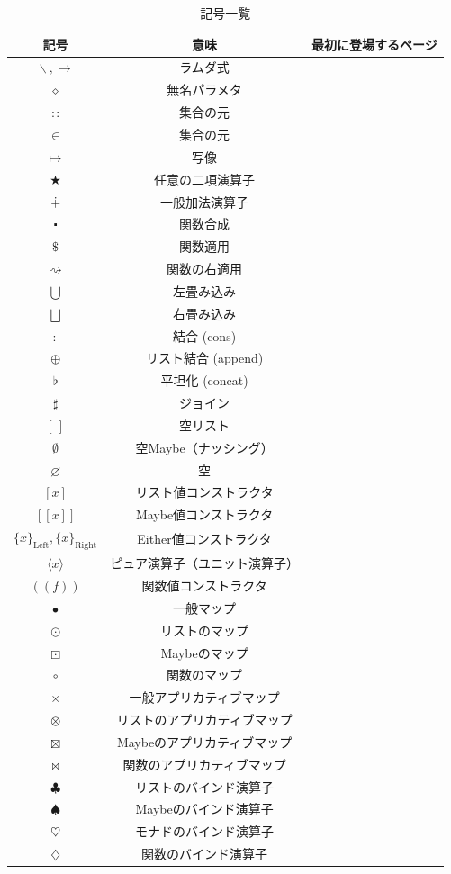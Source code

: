 \documentclass[a4paper,twocolumn]{jsbook}
\def\[{\left[\!\left[}
\def\]{\right]\!\right]}
\def\({\left(\!\left(}
\def\){\right)\!\right)}
\newcommand{\mEmptyList}{{[\,]}}
\newcommand{\mNothing}{\emptyset}
\newcommand{\mPureNothing}{\varnothing}
\newcommand{\mAnonParam}{\diamond}
\DeclareMathOperator{\mAppend}{\oplus}
\DeclareMathOperator{\mApply}{\$}
\DeclareMathOperator{\mApplyRight}{\rightsquigarrow}
\DeclareMathOperator{\mAppMap}{\times}
\DeclareMathOperator{\mAppMapFunc}{\bowtie}
\DeclareMathOperator{\mAppMapList}{\otimes}
\DeclareMathOperator{\mAppMapMaybe}{\boxtimes}
\DeclareMathOperator{\mBind}{\heartsuit}
\DeclareMathOperator{\mBindFunc}{\diamondsuit}
\DeclareMathOperator{\mBindList}{\clubsuit}
\DeclareMathOperator{\mBindMaybe}{\spadesuit}
\DeclareMathOperator{\mBinOp}{\bigstar}
\DeclareMathOperator{\mComp}{\centerdot}
\DeclareMathOperator{\mConcat}{\flat}
\DeclareMathOperator{\mCons}{:}
\DeclareMathOperator*{\mFold}{\bigcup}
\DeclareMathOperator*{\mFoldRight}{\bigsqcup}
\DeclareMathOperator{\mIn}{{:\!:}}
\DeclareMathOperator{\mJoin}{\sharp}
\DeclareMathOperator{\mLambda}{\backslash}
\DeclareMathOperator{\mLambdaArrow}{\rightarrow}
\DeclareMathOperator{\mMap}{\bullet}
\DeclareMathOperator{\mMapFunc}{\circ}
\DeclareMathOperator{\mMapList}{\odot}
\DeclareMathOperator{\mMapMaybe}{\boxdot}
\DeclareMathOperator{\mMapsTo}{\mapsto}
\DeclareMathOperator{\mPlus}{\dotplus}
\newcommand{\mSpecialSub}[1]{\text{#1}}
\newcommand{\mLeft}{\mSpecialSub{Left}}
\newcommand{\mRight}{\mSpecialSub{Right}}
\newcommand{\mEitherLeftWith}[1]{\{#1\}_\mLeft}
\newcommand{\mEitherRightWith}[1]{\{#1\}_\mRight}
\newcommand{\mFuncWith}[1]{\(#1\)}
\newcommand{\mListWith}[1]{\left[#1\right]}
\newcommand{\mMaybeWith}[1]{\[#1\]}
\newcommand{\mPureWith}[1]{\langle#1\rangle}
\begin{document}
\begin{table}[p]
\caption{記号一覧}
\begin{center}
\begin{tabular}{||c|c|c||}
\hline
記号&意味&最初に登場するページ\\
\hline\hline
$\mLambda, \mLambdaArrow$&ラムダ式&\\
$\mAnonParam$&無名パラメタ&\\
\hline
$\mIn$&集合の元&\\
$\in$&集合の元&\\
$\mMapsTo$&写像&\\\hline
$\mBinOp$&任意の二項演算子&\\
$\mPlus$&一般加法演算子&\\
\hline
$\mComp$&関数合成&\\
$\mApply$&関数適用&\\
$\mApplyRight$&関数の右適用&\\\hline
$\mFold$&左畳み込み&\\
$\mFoldRight$&右畳み込み&\\
\hline
$\mCons$&結合 (cons)&\\
$\mAppend$&リスト結合 (append)&\\
$\mConcat$&平坦化 (concat)&\\
$\mJoin$&ジョイン&\\
\hline
$\mEmptyList$&空リスト&\\
$\mNothing$&空Maybe（ナッシング）&\\
$\mPureNothing$&空&\\\hline
$\mListWith{x}$&リスト値コンストラクタ&\\
$\mMaybeWith{x}$&Maybe値コンストラクタ&\\
$\mEitherLeftWith{x},\mEitherRightWith{x}$&Either値コンストラクタ&\\
$\mPureWith{x}$&ピュア演算子（ユニット演算子）&\\
$\mFuncWith{f}$&関数値コンストラクタ&\\
\hline
$\mMap$&一般マップ&\\
$\mMapList$&リストのマップ&\\
$\mMapMaybe$&Maybeのマップ&\\
$\mMapFunc$&関数のマップ&\\
\hline
$\mAppMap$&一般アプリカティブマップ&\\
$\mAppMapList$&リストのアプリカティブマップ&\\
$\mAppMapMaybe$&Maybeのアプリカティブマップ&\\
$\mAppMapFunc$&関数のアプリカティブマップ&\\
\hline
$\mBindList$&リストのバインド演算子&\\
$\mBindMaybe$&Maybeのバインド演算子&\\
$\mBind$&モナドのバインド演算子&\\
$\mBindFunc$&関数のバインド演算子&\\
\hline
\end{tabular}
\end{center}
\end{table}
\end{document}
